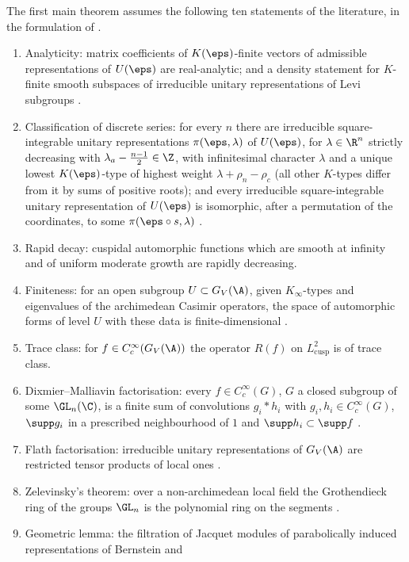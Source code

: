 \begin{hypothesis}\label{pf:multnc:hyp-published}
The first main theorem assumes the following ten statements of the literature, in the formulation of
\cite{LeanSource2026}.
\begin{enumerate}[label=(H\arabic*)]
\item Analyticity: matrix coefficients of $K(\eps)$-finite vectors of admissible representations of $U(\eps)$ are
real-analytic; and a density statement for $K$-finite smooth subspaces of irreducible unitary representations of Levi
subgroups \cite{HarishChandra1953}.
\item Classification of discrete series: for every $n$ there are irreducible square-integrable unitary representations
$\pi(\eps,\lambda)$ of $U(\eps)$, for $\lambda\in\R^n$ strictly decreasing with $\lambda_a-\frac{n-1}2\in\Z$, with
infinitesimal character $\lambda$ and a unique lowest $K(\eps)$-type of highest weight $\lambda+\rho_n-\rho_c$ (all
other $K$-types differ from it by sums of positive roots); and every irreducible square-integrable unitary
representation of $U(\eps)$ is isomorphic, after a permutation of the coordinates, to some $\pi(\eps\circ s,\lambda)$
\cite{HarishChandra1966}.
\item Rapid decay: cuspidal automorphic functions which are smooth at infinity and of uniform moderate growth are rapidly
decreasing.
\item Finiteness: for an open subgroup $U\subset G_V(\A)$, given $K_\infty$-types and eigenvalues of the archimedean
Casimir operators, the space of automorphic forms of level $U$ with these data is finite-dimensional
\cite{HarishChandra1968}.
\item Trace class: for $f\in C_c^\infty(G_V(\A))$ the operator $R(f)$ on $L^2_{\mathrm{cusp}}$ is of trace class.
\item Dixmier--Malliavin factorisation: every $f\in C_c^\infty(G)$, $G$ a closed subgroup of some $\GL_n(\C)$, is a finite
sum of convolutions $g_i*h_i$ with $g_i,h_i\in C_c^\infty(G)$, $\supp g_i$ in a prescribed neighbourhood of $1$ and
$\supp h_i\subset\supp f$ \cite{DixmierMalliavin1978}.
\item Flath factorisation: irreducible unitary representations of $G_V(\A)$ are restricted tensor products of local ones
\cite{Flath1979}.
\item Zelevinsky's theorem: over a non-archimedean local field the Grothendieck ring of the groups $\GL_n$ is the
polynomial ring on the segments \cite{Zelevinsky1980}.
\item Geometric lemma: the filtration of Jacquet modules of parabolically induced representations of Bernstein and

\end{enumerate}
\end{hypothesis}
